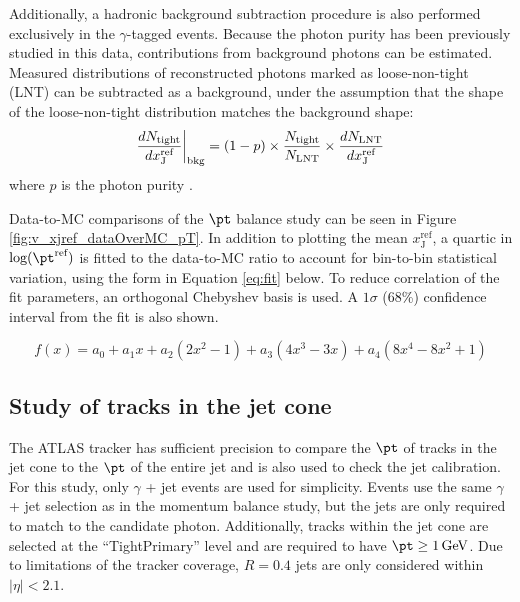 \documentclass[NOTE, atlasdraft=true, texlive=2016, USenglish]{\ATLASLATEXPATH atlasdoc}
\begin{document}
Additionally, a hadronic background subtraction procedure is also performed exclusively in the $\gamma$-tagged events. Because the photon purity has been previously studied in this data, contributions from background photons can be estimated. Measured distributions of reconstructed photons marked as loose-non-tight (LNT) can be subtracted as a background, under the assumption that the shape of the loose-non-tight distribution matches the background shape:
\begin{equation}
	\frac{dN_{\text{tight}}}{dx^{\text{ref}}_{\text{J}}}\bigg{|}_{\text{bkg}} = (1 - p) \times \frac{N_{\text{tight}}}{N_{\text{LNT}}} \times \frac{dN_{\text{LNT}}}{dx^{\text{ref}}_{\text{J}}}
	\label{eq:bkg}
\end{equation}
 where $p$ is the photon purity \cite{ATL-COM-PHYS-2017-999}.
%

Data-to-MC comparisons of the $\pt$ balance study can be seen in Figure \ref{fig:v_xjref_dataOverMC_pT}.  In addition to plotting the mean $x_{\text{J}}^{\text{ref}}$, a quartic in $\text{log}(\pt^{\text{ref}})$ is fitted to the data-to-MC ratio to account for bin-to-bin statistical variation, using the form in Equation \ref{eq:fit} below. To reduce correlation of the fit parameters, an orthogonal Chebyshev basis is used. A $1\sigma$ (68\%) confidence interval from the fit is also shown.

\begin{equation}
	f (x) = a_0 + a_1x  + a_2\left(2x^2 - 1\right) + a_3\left(4x^3-3x\right) + a_4\left(8x^4-8x^2+1\right)
	\label{eq:fit}
\end{equation}

\subsection{Study of tracks in the jet cone}
The ATLAS tracker has sufficient precision to compare the $\pt$ of tracks in the jet cone to the $\pt$ of the entire jet and is also used to check the jet calibration. For this study, only $\gamma$ + jet events are used for simplicity. Events use the same $\gamma$ + jet selection as in the momentum balance study, but the jets are only required to match to the candidate photon. Additionally, tracks within the jet cone are selected at the ``TightPrimary'' level and are required to have $\pt \geq \SI{1}{\GeV}$. Due to limitations of the tracker coverage, $R=0.4$ jets are only considered within $\left|\eta\right| < 2.1$.
\end{document}
